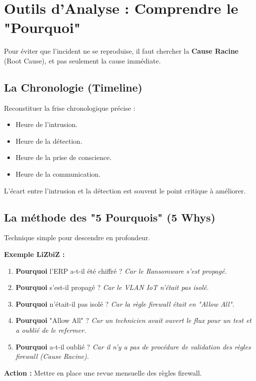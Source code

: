 \section{Outils d'Analyse : Comprendre le "Pourquoi"}

Pour éviter que l'incident ne se reproduise, il faut chercher la \textbf{Cause Racine} (Root Cause), et pas seulement la cause immédiate.

\subsection{La Chronologie (Timeline)}

Reconstituer la frise chronologique précise :
\begin{itemize}
    \item Heure de l'intrusion.
    \item Heure de la détection.
    \item Heure de la prise de conscience.
    \item Heure de la communication.
\end{itemize}

L'écart entre l'intrusion et la détection est souvent le point critique à améliorer.

\subsection{La méthode des "5 Pourquois" (5 Whys)}

Technique simple pour descendre en profondeur.

\begin{boxlizbiz}
\textbf{Exemple LiZbiZ :}
\begin{enumerate}
    \item \textbf{Pourquoi} l'ERP a-t-il été chiffré ? \textit{Car le Ransomware s'est propagé.}
    \item \textbf{Pourquoi} s'est-il propagé ? \textit{Car le VLAN IoT n'était pas isolé.}
    \item \textbf{Pourquoi} n'était-il pas isolé ? \textit{Car la règle firewall était en "Allow All".}
    \item \textbf{Pourquoi} "Allow All" ? \textit{Car un technicien avait ouvert le flux pour un test et a oublié de le refermer.}
    \item \textbf{Pourquoi} a-t-il oublié ? \textit{Car il n'y a pas de procédure de validation des règles firewall (Cause Racine).}
\end{enumerate}
\textbf{Action :} Mettre en place une revue mensuelle des règles firewall.
\end{boxlizbiz}

